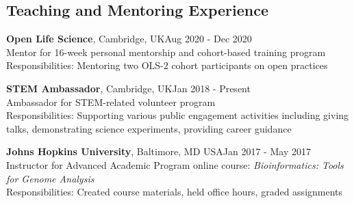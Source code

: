 \documentclass[margin,line]{res}
\begin{document}
\begin{resume}

\section{\sc Teaching and Mentoring Experience}
{\bf Open Life Science}, Cambridge, UK\hfill {Aug 2020 - Dec 2020}\\
Mentor for 16-week personal mentorship and cohort-based training program\\
Responsibilities: Mentoring two OLS-2 cohort participants on open practices

{\bf STEM Ambassador}, Cambridge, UK\hfill {Jan 2018 - Present}\\
Ambassador for STEM-related volunteer program\\
Responsibilities: Supporting various public engagement activities including giving talks, demonstrating science experiments, providing career guidance

{\bf Johns Hopkins University}, Baltimore, MD USA\hfill {Jan 2017 - May 2017}\\
Instructor for Advanced Academic Program online course: {\em Bioinformatics: Tools for Genome Analysis}\\
Responsibilities: Created course materials, held office hours, graded assignments



\end{resume}
\end{document}
